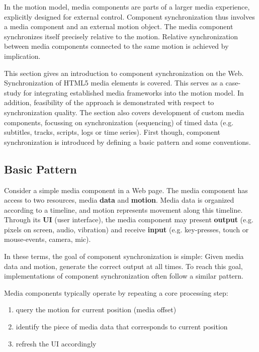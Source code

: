 In the motion model, media components are parts of a larger media experience,
explicitly designed for external control. Component synchronization thus
involves a media component and an external motion object. The media component
synchronizes itself precisely relative to the motion. Relative synchronization
between media components connected to the same motion is achieved by
implication.

This section gives an introduction to component synchronization on the Web.
Synchronization of HTML5 media elements is covered. This serves as a case-
study for integrating established media frameworks into the motion model. In
addition, feasibility of the approach is demonstrated with respect to
synchronization quality. The section also covers development of custom media
components, focussing on synchronization (sequencing) of timed data (e.g.
subtitles, tracks, scripts, logs or time series). First though, component
synchronization is introduced by defining a basic pattern and some conventions.

\subsection{Basic Pattern}
\label{sec:pattern}

Consider a simple media component in a Web page. The media component has
access to two resources, media \textbf{data} and \textbf{motion}. Media data
is organized according to a timeline, and motion represents movement along
this timeline. Through its \textbf{UI} (user interface), the media component
may present \textbf{output} (e.g. pixels on screen, audio, vibration) and
receive \textbf{input} (e.g. key-presses, touch or mouse-events, camera, mic).

In these terms, the goal of component synchronization is simple: Given media
data and motion, generate the correct output at all times. To reach this goal,
implementations of component synchronization often follow a similar pattern.


Media components typically operate by repeating a core processing step:
\begin{enumerate}
\item{query the motion for current position (media offset)}
\item{identify the piece of media data that corresponds to current position}
\item{refresh the UI accordingly}
\end{enumerate}

